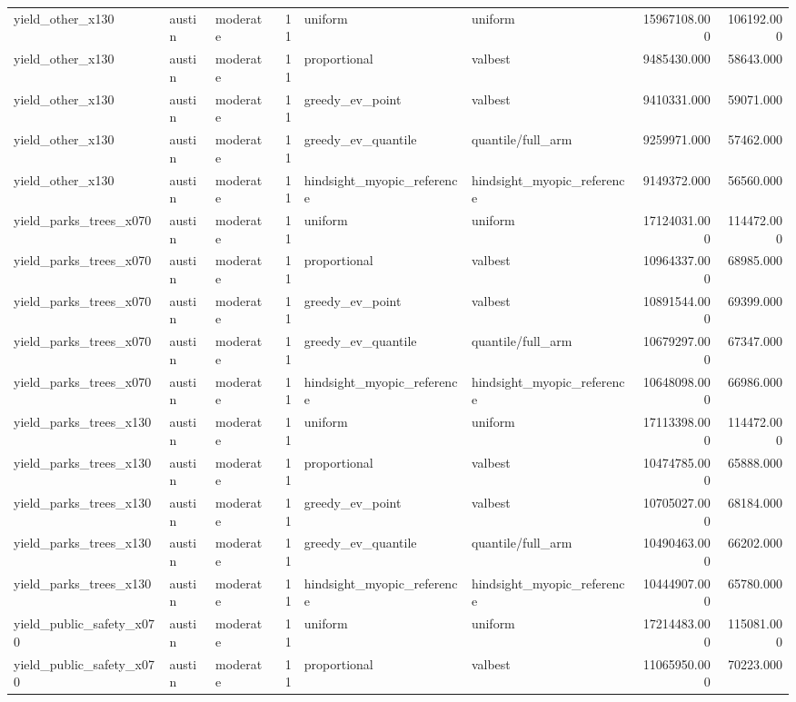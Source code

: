 \begin{tabular}{lllrllrr}
yield\_other\_x130 & austin & moderate & 11 & uniform & uniform & 15967108.000 & 106192.000 \\
yield\_other\_x130 & austin & moderate & 11 & proportional & valbest & 9485430.000 & 58643.000 \\
yield\_other\_x130 & austin & moderate & 11 & greedy\_ev\_point & valbest & 9410331.000 & 59071.000 \\
yield\_other\_x130 & austin & moderate & 11 & greedy\_ev\_quantile & quantile/full\_arm & 9259971.000 & 57462.000 \\
yield\_other\_x130 & austin & moderate & 11 & hindsight\_myopic\_reference & hindsight\_myopic\_reference & 9149372.000 & 56560.000 \\
yield\_parks\_trees\_x070 & austin & moderate & 11 & uniform & uniform & 17124031.000 & 114472.000 \\
yield\_parks\_trees\_x070 & austin & moderate & 11 & proportional & valbest & 10964337.000 & 68985.000 \\
yield\_parks\_trees\_x070 & austin & moderate & 11 & greedy\_ev\_point & valbest & 10891544.000 & 69399.000 \\
yield\_parks\_trees\_x070 & austin & moderate & 11 & greedy\_ev\_quantile & quantile/full\_arm & 10679297.000 & 67347.000 \\
yield\_parks\_trees\_x070 & austin & moderate & 11 & hindsight\_myopic\_reference & hindsight\_myopic\_reference & 10648098.000 & 66986.000 \\
yield\_parks\_trees\_x130 & austin & moderate & 11 & uniform & uniform & 17113398.000 & 114472.000 \\
yield\_parks\_trees\_x130 & austin & moderate & 11 & proportional & valbest & 10474785.000 & 65888.000 \\
yield\_parks\_trees\_x130 & austin & moderate & 11 & greedy\_ev\_point & valbest & 10705027.000 & 68184.000 \\
yield\_parks\_trees\_x130 & austin & moderate & 11 & greedy\_ev\_quantile & quantile/full\_arm & 10490463.000 & 66202.000 \\
yield\_parks\_trees\_x130 & austin & moderate & 11 & hindsight\_myopic\_reference & hindsight\_myopic\_reference & 10444907.000 & 65780.000 \\
yield\_public\_safety\_x070 & austin & moderate & 11 & uniform & uniform & 17214483.000 & 115081.000 \\
yield\_public\_safety\_x070 & austin & moderate & 11 & proportional & valbest & 11065950.000 & 70223.000 \\

\end{tabular}
